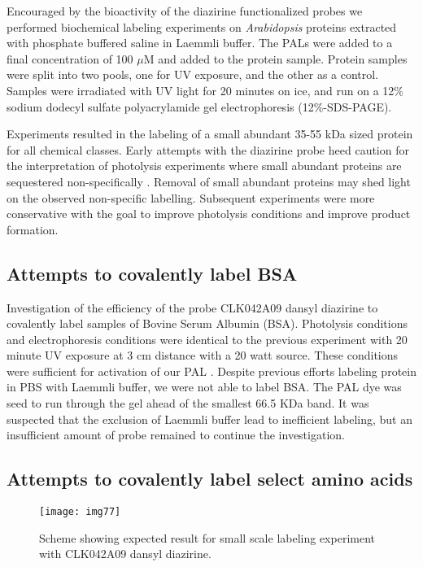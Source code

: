 Encouraged by the bioactivity of the diazirine functionalized probes we performed biochemical labeling experiments on {\it Arabidopsis} proteins extracted with phosphate buffered saline in Laemmli buffer. The PALs were added to a final concentration of 100 $\mu$M and added to the protein sample. Protein samples were split into two pools, one for UV exposure, and the other as a control. Samples were irradiated with UV light for 20 minutes on ice, and run on a 12{\%} sodium dodecyl sulfate polyacrylamide gel electrophoresis (12{\%}-SDS-PAGE).

Experiments resulted in the labeling of a small abundant 35-55 kDa sized protein for all chemical classes. Early attempts with the diazirine probe heed caution for the interpretation of photolysis experiments where small abundant proteins are sequestered non-specifically \cite{work1979laboratory}. Removal of small abundant proteins may shed light on the observed non-specific labelling. Subsequent experiments were more conservative with the goal to improve photolysis conditions and improve product formation.

\subsection{Attempts to covalently label BSA}

Investigation of the efficiency of the probe CLK042A09 dansyl diazirine to covalently label samples of Bovine Serum Albumin (BSA). Photolysis conditions and electrophoresis conditions were identical to the previous experiment with 20 minute UV exposure at 3 cm distance with a 20 watt source. These conditions were sufficient for activation of our PAL \cite{klan2009photochemistry}. Despite previous efforts labeling protein in PBS with Laemmli buffer, we were not able to label BSA. The PAL dye was seed to run through the gel ahead of the smallest 66.5 KDa band. It was suspected that the exclusion of Laemmli buffer lead to inefficient labeling, but an insufficient amount of probe remained to continue the investigation.

\subsection{Attempts to covalently label select amino acids}

\begin{figure}
\centering
\texttt{[image: img77]}
\caption{Scheme showing expected result for small scale labeling experiment with CLK042A09 dansyl diazirine.}
\label{fig:DiazirineLabelAA}
\end{figure}

